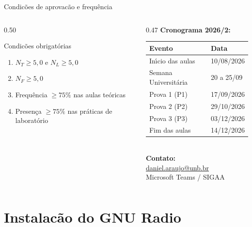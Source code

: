 \documentclass[aspectratio=169]{beamer}
\makeatletter
\newcommand{\autorEmail}{daniel.araujo@unb.br}
\makeatother
\begin{document}
\begin{frame}{Condic\~{o}es de aprovac\~{a}o e frequ\^{e}ncia}
\begin{columns}
\begin{column}{0.50\textwidth}
  \begin{alertblock}{Condic\~{o}es obrigat\'{o}rias}
  \small
  \begin{enumerate}\setlength{\itemsep}{1pt}
    \item $N_T \geq 5{,}0$ e $N_L \geq 5{,}0$
    \item $N_F \geq 5{,}0$
    \item Frequ\^{e}ncia $\geq 75\%$ nas aulas te\'{o}ricas
    \item Presen\c{c}a $\geq 75\%$ nas pr\'{a}ticas de laborat\'{o}rio
  \end{enumerate}
  \end{alertblock}
\end{column}
\begin{column}{0.47\textwidth}
  \textbf{Cronograma 2026/2:}
  \vspace{0.1cm}
  \begin{tabular}{ll}
    \hline
    \textbf{Evento} & \textbf{Data} \\
    \hline
    In\'{\i}cio das aulas  & 10/08/2026 \\
    Semana Universit\'{a}ria & 20 a 25/09 \\
    Prova 1 (P1)       & 17/09/2026 \\
    Prova 2 (P2)       & 29/10/2026 \\
    Prova 3 (P3)       & 03/12/2026 \\
    Fim das aulas      & 14/12/2026 \\
    \hline
  \end{tabular}
  \vspace{0.2cm}\\
  \textbf{Contato:}\\
  \href{mailto:\autorEmail}{\autorEmail}\\
  Microsoft Teams / SIGAA
\end{column}
\end{columns}
\end{frame}

\section{Instalac\~{a}o do GNU Radio}
\end{document}
